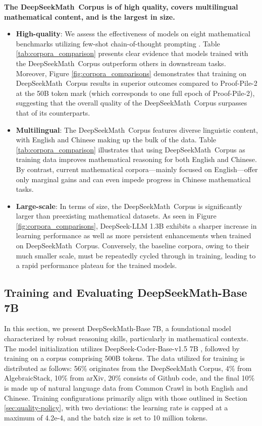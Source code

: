 \begin{itemize}[topsep=0pt]
\textbf{The DeepSeekMath~Corpus is of high quality, covers multilingual mathematical content, and is the largest in size.}

\begin{itemize}[topsep=0pt]
    \item \textbf{High-quality}:
    We assess the effectiveness of models on eight mathematical benchmarks utilizing few-shot chain-of-thought prompting \cite{cot}. Table \ref{tab:corpora_comparison} presents clear evidence that models trained with the DeepSeekMath~Corpus outperform others in downstream tasks. Moreover, Figure \ref{fig:corpora_comparisons} demonstrates that training on DeepSeekMath~Corpus results in superior outcomes compared to Proof-Pile-2 at the 50B token mark (which corresponds to one full epoch of Proof-Pile-2), suggesting that the overall quality of the DeepSeekMath~Corpus surpasses that of its counterparts. 
    \item \textbf{Multilingual}:
    The DeepSeekMath~Corpus features diverse linguistic content, with English and Chinese making up the bulk of the data. Table \ref{tab:corpora_comparison} illustrates that using DeepSeekMath~Corpus as training data improves mathematical reasoning for both English and Chinese. By contrast, current mathematical corpora—mainly focused on English—offer only marginal gains and can even impede progress in Chinese mathematical tasks.
    \item \textbf{Large-scale}:
    In terms of size, the DeepSeekMath~Corpus is significantly larger than preexisting mathematical datasets. As seen in Figure \ref{fig:corpora_comparisons}, DeepSeek-LLM 1.3B exhibits a sharper increase in learning performance as well as more persistent enhancements when trained on DeepSeekMath~Corpus. Conversely, the baseline corpora, owing to their much smaller scale, must be repeatedly cycled through in training, leading to a rapid performance plateau for the trained models.
\end{itemize}

\subsection{Training and Evaluating DeepSeekMath-Base 7B}

In this section, we present DeepSeekMath-Base 7B, a foundational model characterized by robust reasoning skills, particularly in mathematical contexts. The model initialization utilizes DeepSeek-Coder-Base-v1.5 7B \citep{deepseek-coder}, followed by training on a corpus comprising 500B tokens. The data utilized for training is distributed as follows: 56\% originates from the DeepSeekMath Corpus, 4\% from AlgebraicStack, 10\% from arXiv, 20\% consists of Github code, and the final 10\% is made up of natural language data from Common Crawl in both English and Chinese. Training configurations primarily align with those outlined in Section \ref{sec:quality-policy}, with two deviations: the learning rate is capped at a maximum of 4.2e-4, and the batch size is set to 10 million tokens.


\end{itemize}
